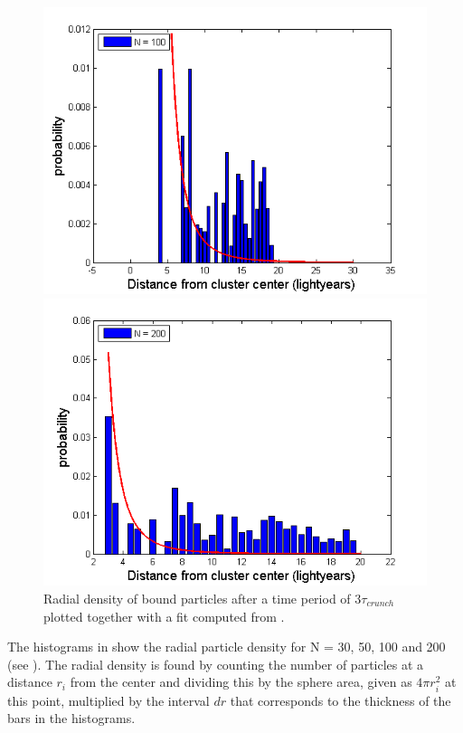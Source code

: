 \begin{figure}[H]
\begin{minipage}{.5\textwidth}
  \includegraphics[width=1\linewidth]{Figures/N100.png}
\end{minipage}%
\begin{minipage}{.5\textwidth}
  \centering
  \includegraphics[width=1\linewidth]{Figures/N200.png}
\end{minipage}
\caption{
Radial density of bound particles after a time period of $3\tau_{crunch}$ plotted together with a fit computed from .
}
\label{fig:NumberPartRadDist}
\end{figure}
The histograms in  show the radial particle density for N = 30, 50, 100 and 200 (see ).
The radial density is found by counting the number of particles at a distance $r_i$ from the center and dividing this by the sphere area, given as $4\pi r_i^2$ at this point, multiplied by the interval $dr$ that corresponds to the thickness of the bars in the histograms. 
